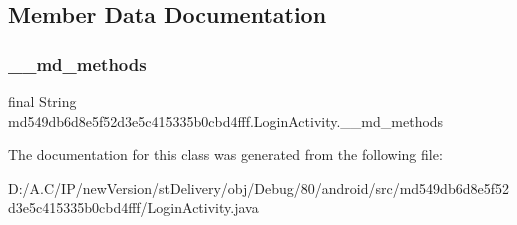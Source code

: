 \subsection{Member Data Documentation}
\mbox{\label{classmd549db6d8e5f52d3e5c415335b0cbd4fff_1_1_login_activity_a0b3776ea9c20482f6987b8e37b057b92}} 
\subsubsection{\texorpdfstring{\+\_\+\+\_\+md\+\_\+methods}{\_\_md\_methods}}
{\footnotesize\ttfamily final String md549db6d8e5f52d3e5c415335b0cbd4fff.\+Login\+Activity.\+\_\+\+\_\+md\+\_\+methods\hspace{0.3cm}{\ttfamily [static]}}



The documentation for this class was generated from the following file\+:\begin{DoxyCompactItemize}
\item 
D\+:/\+A.\+C/\+I\+P/new\+Version/st\+Delivery/obj/\+Debug/80/android/src/md549db6d8e5f52d3e5c415335b0cbd4fff/Login\+Activity.\+java\end{DoxyCompactItemize}
